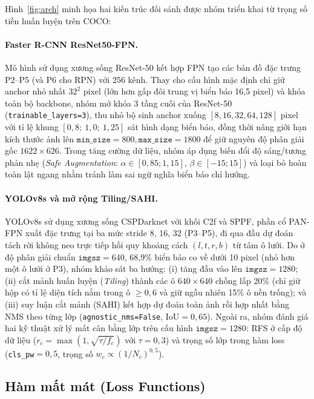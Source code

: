 \documentclass[11pt]{article}
\begin{document}
Hình~\ref{fig:arch} minh họa hai kiến trúc đối sánh được nhóm triển khai từ trọng số tiền huấn luyện trên COCO:

\paragraph{Faster R-CNN ResNet50-FPN.}
Mô hình sử dụng xương sống ResNet-50 kết hợp FPN tạo các bản đồ đặc trưng P2--P5 (và P6 cho RPN) với 256 kênh. Thay cho cấu hình mặc định chỉ giữ anchor nhỏ nhất $32^2$ pixel (lớn hơn gấp đôi trung vị biển báo 16,5 pixel) và khóa toàn bộ backbone, nhóm mở khóa 3 tầng cuối của ResNet-50 (\texttt{trainable\_layers=3}), thu nhỏ bộ sinh anchor xuống $[8, 16, 32, 64, 128]$ pixel với tỉ lệ khung $[0{,}8;\ 1{,}0;\ 1{,}25]$ sát hình dạng biển báo, đồng thời nâng giới hạn kích thước ảnh lên $\texttt{min\_size}=800, \texttt{max\_size}=1800$ để giữ nguyên độ phân giải gốc $1622 \times 626$. Trong tăng cường dữ liệu, nhóm áp dụng biến đổi độ sáng/tương phản nhẹ (\textit{Safe Augmentation}: $\alpha \in [0{,}85; 1{,}15]$, $\beta \in [-15; 15]$) và loại bỏ hoàn toàn lật ngang nhằm tránh làm sai ngữ nghĩa biển báo chỉ hướng.

\paragraph{YOLOv8s và mở rộng Tiling/SAHI.}
YOLOv8s sử dụng xương sống CSPDarknet với khối C2f và SPPF, phần cổ PAN-FPN xuất đặc trưng tại ba mức stride 8, 16, 32 (P3--P5), đi qua đầu dự đoán tách rời không neo trực tiếp hồi quy khoảng cách $(l, t, r, b)$ từ tâm ô lưới. Do ở độ phân giải chuẩn $\texttt{imgsz}=640$, 68,9\% biển báo co về dưới 10 pixel (nhỏ hơn một ô lưới ở P3), nhóm khảo sát ba hướng: (i) tăng đầu vào lên $\texttt{imgsz}=1280$; (ii) cắt mảnh huấn luyện (\textit{Tiling}) thành các ô $640 \times 640$ chồng lấp 20\% (chỉ giữ hộp có tỉ lệ diện tích nằm trong ô $\ge 0{,}6$ và giữ ngẫu nhiên 15\% ô nền trống); và (iii) suy luận cắt mảnh (SAHI) kết hợp dự đoán toàn ảnh rồi hợp nhất bằng NMS theo từng lớp (\texttt{agnostic\_nms=False}, $\text{IoU}=0{,}65$). Ngoài ra, nhóm đánh giá hai kỹ thuật xử lý mất cân bằng lớp trên cấu hình $\texttt{imgsz}=1280$: RFS ở cấp độ dữ liệu ($r_c = \max(1, \sqrt{\tau / f_c})$ với $\tau = 0{,}3$) và trọng số lớp trong hàm loss (\texttt{cls\_pw}$=0{,}5$, trọng số $w_c \propto (1/N_c)^{0{,}5}$).

\subsection{Hàm mất mát (Loss Functions)}
\end{document}
